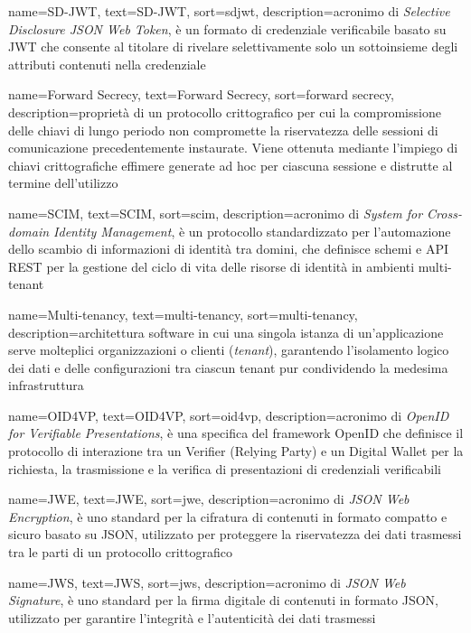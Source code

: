 {
    name=SD-JWT,
    text=SD-JWT,
    sort=sdjwt,
    description={acronimo di \emph{Selective Disclosure JSON Web Token}, è un formato di credenziale verificabile basato su JWT che consente al titolare di rivelare selettivamente solo un sottoinsieme degli attributi contenuti nella credenziale}
}

{
    name=Forward Secrecy,
    text=Forward Secrecy,
    sort=forward secrecy,
    description={proprietà di un protocollo crittografico per cui la compromissione delle chiavi di lungo periodo non compromette la riservatezza delle sessioni di comunicazione precedentemente instaurate. Viene ottenuta mediante l'impiego di chiavi crittografiche effimere generate ad hoc per ciascuna sessione e distrutte al termine dell'utilizzo}
}

{
    name=SCIM,
    text=SCIM,
    sort=scim,
    description={acronimo di \emph{System for Cross-domain Identity Management}, è un protocollo standardizzato per l'automazione dello scambio di informazioni di identità tra domini, che definisce schemi e API REST per la gestione del ciclo di vita delle risorse di identità in ambienti multi-tenant}
}

{
    name=Multi-tenancy,
    text=multi-tenancy,
    sort=multi-tenancy,
    description={architettura software in cui una singola istanza di un'applicazione serve molteplici organizzazioni o clienti (\emph{tenant}), garantendo l'isolamento logico dei dati e delle configurazioni tra ciascun tenant pur condividendo la medesima infrastruttura}
}

{
    name=OID4VP,
    text=OID4VP,
    sort=oid4vp,
    description={acronimo di \emph{OpenID for Verifiable Presentations}, è una specifica del framework OpenID che definisce il protocollo di interazione tra un Verifier (Relying Party) e un Digital Wallet per la richiesta, la trasmissione e la verifica di presentazioni di credenziali verificabili}
}

{
    name=JWE,
    text=JWE,
    sort=jwe,
    description={acronimo di \emph{JSON Web Encryption}, è uno standard per la cifratura di contenuti in formato compatto e sicuro basato su JSON, utilizzato per proteggere la riservatezza dei dati trasmessi tra le parti di un protocollo crittografico}
}

{
    name=JWS,
    text=JWS,
    sort=jws,
    description={acronimo di \emph{JSON Web Signature}, è uno standard per la firma digitale di contenuti in formato JSON, utilizzato per garantire l'integrità e l'autenticità dei dati trasmessi}
}

